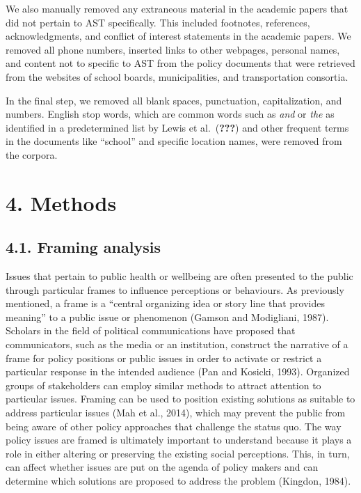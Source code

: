 \documentclass[]{elsarticle} %
\begin{document}
We also manually removed any extraneous material in the academic papers
that did not pertain to AST specifically. This included footnotes,
references, acknowledgments, and conflict of interest statements in the
academic papers. We removed all phone numbers, inserted links to other
webpages, personal names, and content not to specific to AST from the
policy documents that were retrieved from the websites of school boards,
municipalities, and transportation consortia.

In the final step, we removed all blank spaces, punctuation,
capitalization, and numbers. English stop words, which are common words
such as \emph{and} or \emph{the} as identified in a predetermined list
by Lewis et al.~({\textbf{???}}) and other frequent terms in the
documents like ``school'' and specific location names, were removed from
the corpora.

\hypertarget{methods}{%
\section{4. Methods}\label{methods}}

\hypertarget{framing-analysis}{%
\subsection{4.1. Framing analysis}\label{framing-analysis}}

Issues that pertain to public health or wellbeing are often presented to
the public through particular frames to influence perceptions or
behaviours. As previously mentioned, a frame is a ``central organizing
idea or story line that provides meaning'' to a public issue or
phenomenon (Gamson and Modigliani, 1987). Scholars in the field of
political communications have proposed that communicators, such as the
media or an institution, construct the narrative of a frame for policy
positions or public issues in order to activate or restrict a particular
response in the intended audience (Pan and Kosicki, 1993). Organized
groups of stakeholders can employ similar methods to attract attention
to particular issues. Framing can be used to position existing solutions
as suitable to address particular issues (Mah et al., 2014), which may
prevent the public from being aware of other policy approaches that
challenge the status quo. The way policy issues are framed is ultimately
important to understand because it plays a role in either altering or
preserving the existing social perceptions. This, in turn, can affect
whether issues are put on the agenda of policy makers and can determine
which solutions are proposed to address the problem (Kingdon, 1984).
\end{document}

